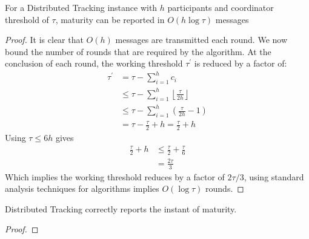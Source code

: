 \begin{theorem} For a Distributed Tracking instance with $h$ participants and coordinator threshold of $\tau$, maturity can be reported in $O(h\log\tau)$ messages
\end{theorem}
\begin{proof}
    It is clear that $O(h)$ messages are transmitted each round. We now bound the number of rounds that are required by the algorithm. At the conclusion of each round, the working threshold $\tau^\prime$ is reduced by a factor of: 
    \begin{align*}
        \tau^\prime &= \tau - \sum_{i=1}^{h}c_i \\
        &\leq \tau - \sum_{i=1}^{h}\left\lfloor \frac{\tau}{2h}\right\rfloor \\
        &\leq \tau - \sum_{i=1}^{h} \left(\frac{\tau}{2h} - 1\right) \\
        &= \tau - \frac{\tau}{2} + h = \frac{\tau}{2} + h
    \end{align*}
    Using $\tau \leq 6h$ gives
    \begin{align*}
        \frac{\tau}{2} +h &\leq \frac{\tau}{2} + \frac{\tau}{6} \\
        &= \frac{2\tau}{3}
    \end{align*}
    Which implies the working threshold reduces by a factor of $2\tau/3$, using standard analysis techniques for algorithms implies $O(\log \tau)$ rounds. 
\end{proof}


\begin{theorem} Distributed Tracking correctly reports the instant of maturity.
\end{theorem}
\begin{proof}
    
\end{proof}
